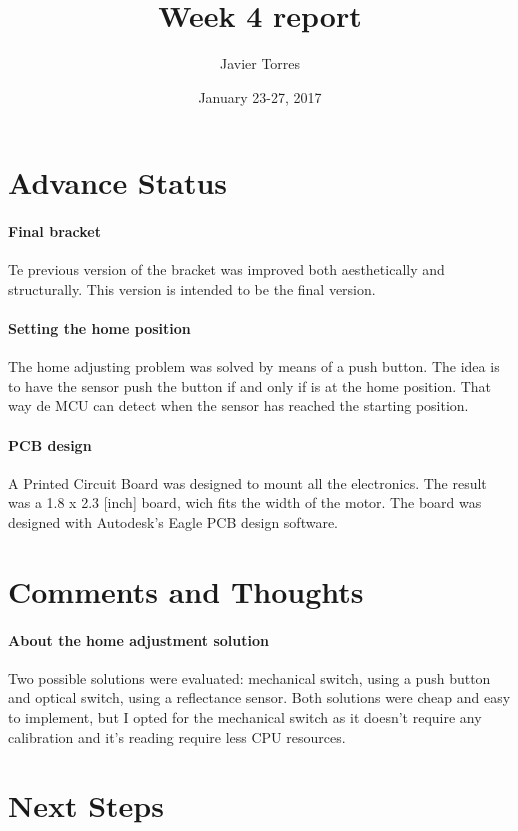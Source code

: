 \documentclass{article}
\title{Week 4 report}
\author{Javier Torres}
\date{January 23-27, 2017}
\begin{document}
\maketitle

\tableofcontents

\section{Advance Status}

\paragraph{Final bracket}
Te previous version of the bracket was improved both aesthetically and structurally. This version is intended to be the final version.

\paragraph{Setting the home position}
The home adjusting problem was solved by means of a push button. The idea is to have the sensor push the button if and only if is at the home position. That way de MCU can detect when the sensor has reached the starting position.

\paragraph{PCB design}
A Printed Circuit Board was designed to mount all the electronics. The result was a 1.8 x 2.3 [inch] board, wich fits the width of the motor. The board was designed with Autodesk's Eagle PCB design software.

\section{Comments and Thoughts}

\paragraph{About the home adjustment solution}
Two possible solutions were evaluated: mechanical switch, using a push button and optical switch, using a reflectance sensor.
Both solutions were cheap and easy to implement, but I opted for the mechanical switch as it doesn't require any calibration and it's reading require less CPU resources.

\section{Next Steps}
\end{document}
